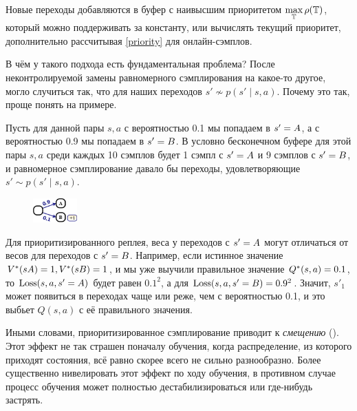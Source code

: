 \begin{remark}
Новые переходы добавляются в буфер с наивысшим приоритетом $\max\limits_{\mathbb{T} } \rho(\mathbb{T} )$, который можно поддерживать за константу, или вычислять текущий приоритет, дополнительно рассчитывая \eqref{priority} для онлайн-сэмплов.
\end{remark}

В чём у такого подхода есть фундаментальная проблема? После неконтролируемой замены равномерного сэмплирования на какое-то другое, могло случиться так, что для наших переходов $s' \not\sim p(s' \mid s, a)$. Почему это так, проще понять на примере.

\begin{example}
Пусть для данной пары $s, a$ с вероятностью 0.1 мы попадаем в $s' \HM= A$, а с вероятностью 0.9 мы попадаем в $s' \HM= B$. В условно бесконечном буфере для этой пары $s, a$ среди каждых 10 сэмплов будет 1 сэмпл с $s' \HM= A$ и 9 сэмплов с $s' \HM= B$, и равномерное сэмплирование давало бы переходы, удовлетворяющие $s' \sim p(s' \mid s, a)$. 

\begin{figure}
\vspace{-0.3cm}
\centering
\includegraphics[width=0.15\textwidth]{Images/PrioritizedIssue.png}
\end{figure}

Для приоритизированного реплея, веса у переходов с $s' \HM= A$ могут отличаться от весов для переходов с $s' \HM= B$. Например, если истинное значение $V^*(s \HM A) \HM= 1, V^*(s \HM B) \HM= 1$, и мы уже выучили правильное значение $Q^*(s, a) \HM= 0.1$, то $\operatorname{Loss}(s, a, s'=A)$ будет равен $0.1^2$, а для $\operatorname{Loss}(s, a, s'=B) = 0.9^2$. Значит, $s'_1$ может появиться в переходах чаще или реже, чем с вероятностью 0.1, и это выбьет $Q(s, a)$ с её правильного значения.
\end{example}

Иными словами, приоритизированное сэмплирование приводит к \emph{смещению} (). Этот эффект не так страшен поначалу обучения, когда распределение, из которого приходят состояния, всё равно скорее всего не сильно разнообразно. Более существенно нивелировать этот эффект по ходу обучения, в противном случае процесс обучения может полностью дестабилизироваться или где-нибудь застрять.


